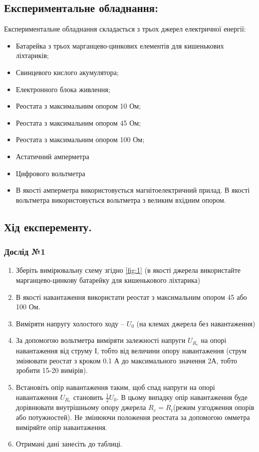 \documentclass[a4paper,12pt]{article}
\begin{document}
\begin{justify}
	\subsection{Експериментальне обладнання:}
	Експериментальне обладнання складається з трьох джерел електричної енергії:
	\begin{itemize}
		\item Батарейка з трьох марганцево-цинкових елементів для кишенькових ліхтариків;
		\item Свинцевого кислого акумулятора;
		\item Електронного блока живлення;
		\item Реостата з максимальним опором 10 Ом;
		\item Реостата з максимальним опором 45 Ом;
		\item Реостата з максимальним опором 100 Ом;
		\item Астатичний амперметра
		\item Цифрового вольтметра
		\item В якості амперметра використовується магнітоелектричний прилад. В якості вольтметра використовується вольтметра з великим вхідним опором.

	\end{itemize}
	\subsection{Хід експеременту.}
	\subsubsection{Дослід №1}
	\begin{enumerate}
		\item Зберіть вимірювальну схему згідно \ref{fig:1} (в якості джерела використайте марганцево-цинкову батарейку для кишенькового ліхтарика)
		\item В якості навантаження використати реостат з максимальним опором 45 або 100 Ом.
		\item Виміряти напругу холостого ходу – $U_0$ (на клемах джерела без навантаження)
		\item За допомогою вольтметра виміряти залежності напруги $U_{R_e}$ на опорі навантаження від струму $І$, тобто від величини опору навантаження (струм змінювати реостат з кроком 0.1 А до максимального значення 2А, тобто зробити 15-20 вимірів).
		\item Встановіть опір навантаження таким, щоб спад напруги на опорі навантаження $U_{R_e}$ становить $\frac12 U_0$. В цьому випадку опір навантаження буде дорівнювати внутрішньому опору джерела $R_e=R_i$(режим узгодження опорів або потужностей). Не змінюючи положення реостата за допомогою омметра виміряйте опір навантаження.
		\item Отримані дані занесіть до таблиці.
	\end{enumerate}

\end{justify}
\end{document}
